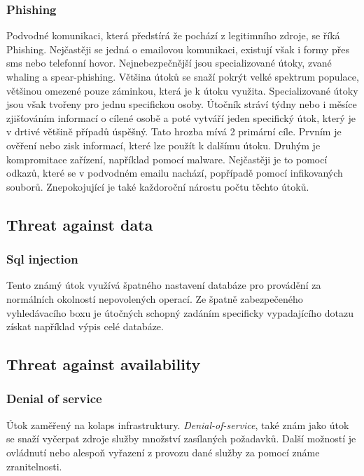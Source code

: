 \subsubsection{Phishing}
Podvodné komunikaci, která předstírá že pochází z legitimního zdroje, se říká Phishing\cite{cisco_most_common_attack}.
Nejčastěji se jedná o emailovou komunikaci, existují však i formy přes sms nebo telefonní hovor.
Nejnebezpečnější jsou specializované útoky, zvané whaling a spear-phishing.
Většina útoků se snaží pokrýt velké spektrum populace, většinou omezené pouze záminkou, která je k útoku využita.
Specializované útoky jsou však tvořeny pro jednu specifickou osoby.
Útočník stráví týdny nebo i měsíce zjišťováním informací o cílené osobě a poté vytváří jeden specifický útok, který je v drtivé většině případů úspěšný.
Tato hrozba mívá 2 primární cíle.
Prvním je ověření nebo zisk informací, které lze použít k dalšímu útoku.
Druhým je kompromitace zařízení, například pomocí malware.
Nejčastěji je to pomocí odkazů, které se v podvodném emailu nachází, popřípadě pomocí infikovaných souborů.
Znepokojující je také každoroční nárostu počtu těchto útoků.\cite{moje_bakalarka}


\subsection{Threat against data}

\subsubsection{Sql injection}
Tento známý útok využívá špatného nastavení databáze pro provádění za normálních okolností nepovolených operací.
Ze špatně zabezpečeného vyhledávacího boxu je útočných schopný zadáním specificky vypadajícího dotazu získat například výpis celé databáze.

\subsection{Threat against availability}

\subsubsection{Denial of service}
Útok zaměřený na kolaps infrastruktury.
\textit{Denial-of-service}, také znám jako  útok se snaží vyčerpat zdroje služby množství zasílaných požadavků.
Další možností je ovládnutí nebo alespoň vyřazení z provozu dané služby za pomocí známe zranitelnosti.\cite{cisco_most_common_attack}


